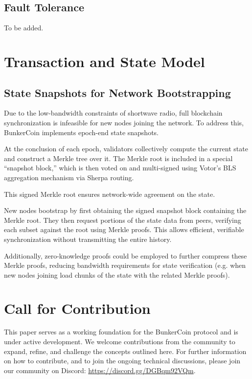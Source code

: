 \documentclass{article}
\begin{document}
\subsection{Fault Tolerance}

To be added.

\section{Transaction and State Model}
\label{sec:transaction_state}

\subsection{State Snapshots for Network Bootstrapping}

Due to the low-bandwidth constraints of shortwave radio, full blockchain synchronization is infeasible for new nodes joining the network. To address this, BunkerCoin implements epoch-end state snapshots.

At the conclusion of each epoch, validators collectively compute the current state and construct a Merkle tree over it. The Merkle root is included in a special ``snapshot block,'' which is then voted on and multi-signed using Votor's BLS aggregation mechanism via Sherpa routing.

This signed Merkle root ensures network-wide agreement on the state.

New nodes bootstrap by first obtaining the signed snapshot block containing the Merkle root. They then request portions of the state data from peers, verifying each subset against the root using Merkle proofs. This allows efficient, verifiable synchronization without transmitting the entire history.

Additionally, zero-knowledge proofs could be employed to further compress these Merkle proofs, reducing bandwidth requirements for state verification (e.g. when new nodes joining load chunks of the state with the related Merkle proofs).

\section{Call for Contribution}

This paper serves as a working foundation for the BunkerCoin protocol and is under active development. We welcome contributions from the community to expand, refine, and challenge the concepts outlined here. For further information on how to contribute, and to join the ongoing technical discussions, please join our community on Discord: \url{https://discord.gg/DGBqm92VQm}.
\end{document}
